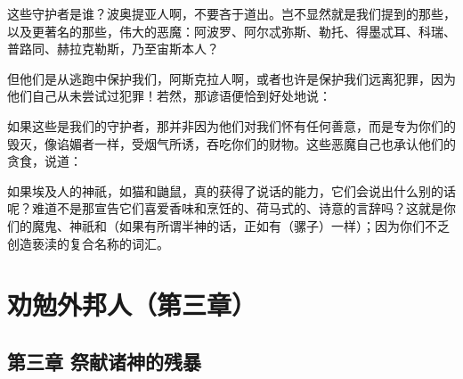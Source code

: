 \par

这些守护者是谁？波奥提亚人啊，不要吝于道出。岂不显然就是我们提到的那些，以及更著名的那些，伟大的恶魔：阿波罗、阿尔忒弥斯、勒托、得墨忒耳、科瑞、普路同、赫拉克勒斯，乃至宙斯本人？\par

但他们是从逃跑中保护我们，阿斯克拉人啊，或者也许是保护我们远离犯罪，因为他们自己从未尝试过犯罪！若然，那谚语便恰到好处地说：\par

\par

如果这些是我们的守护者，那并非因为他们对我们怀有任何善意，而是专为你们的毁灭，像谄媚者一样，受烟气所诱，吞吃你们的财物。这些恶魔自己也承认他们的贪食，说道：\par

\par

如果埃及人的神祇，如猫和鼬鼠，真的获得了说话的能力，它们会说出什么别的话呢？难道不是那宣告它们喜爱香味和烹饪的、荷马式的、诗意的言辞吗？这就是你们的魔鬼、神祇和（如果有所谓半神的话，正如有（骡子）一样）；因为你们不乏创造亵渎的复合名称的词汇。\par



\section{劝勉外邦人（第三章）}

\par


\subsection{第三章 祭献诸神的残暴}

